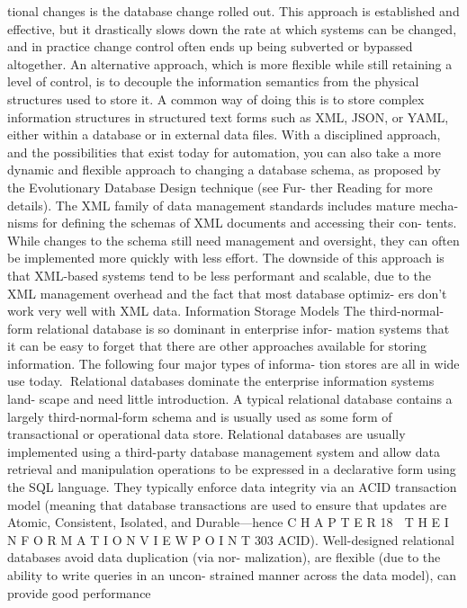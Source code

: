 tional changes is the database change rolled out.
This approach is established and effective, but it drastically slows down the
rate at which systems can be changed, and in practice change control often ends
up being subverted or bypassed altogether. An alternative approach, which is
more flexible while still retaining a level of control, is to decouple the information
semantics from the physical structures used to store it. A common way of doing
this is to store complex information structures in structured text forms such as
XML, JSON, or YAML, either within a database or in external data files. With a
disciplined approach, and the possibilities that exist today for automation, you
can also take a more dynamic and flexible approach to changing a database
schema, as proposed by the Evolutionary Database Design technique (see Fur-
ther Reading for more details).
The XML family of data management standards includes mature mecha-
nisms for defining the schemas of XML documents and accessing their con-
tents. While changes to the schema still need management and oversight, they
can often be implemented more quickly with less effort. The downside of this
approach is that XML-based systems tend to be less performant and scalable,
due to the XML management overhead and the fact that most database optimiz-
ers don’t work very well with XML data.
Information Storage Models
The third-normal-form relational database is so dominant in enterprise infor-
mation systems that it can be easy to forget that there are other approaches
available for storing information. The following four major types of informa-
tion stores are all in wide use today.
Relational databases dominate the enterprise information systems land-
scape and need little introduction. A typical relational database contains
a largely third-normal-form schema and is usually used as some form of
transactional or operational data store. Relational databases are usually
implemented using a third-party database management system and allow
data retrieval and manipulation operations to be expressed in a declarative
form using the SQL language. They typically enforce data integrity via an
ACID transaction model (meaning that database transactions are used to
ensure that updates are Atomic, Consistent, Isolated, and Durable—hence
C H A P T E R 18  T H E I N F O R M A T I O N V I E W P O I N T
 303
ACID). Well-designed relational databases avoid data duplication (via nor-
malization), are flexible (due to the ability to write queries in an uncon-
strained manner across the data model), can provide good performance
